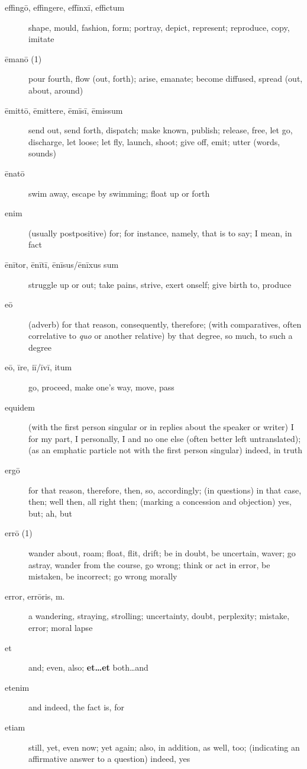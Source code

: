 \begin{description}
    \item[effingō, effingere, effīnxī, effictum] shape, mould, fashion, form; portray, depict, represent; reproduce, copy, imitate
    \item[ēmanō (1)] pour fourth, flow (out, forth); arise, emanate; become diffused, spread (out, about, around)
    \item[ēmittō, ēmittere, ēmīsī, ēmissum] send out, send forth, dispatch; make known, publish; release, free, let go, discharge, let loose; let fly, launch, shoot; give off, emit; utter (words, sounds)
    \item[ēnatō] swim away, escape by swimming; float up or forth
    \item[enim] (usually postpositive) for; for instance, namely, that is to say; I mean, in fact
    \item[ēnītor, ēnītī, ēnīsus/ēnīxus sum] struggle up or out; take pains, strive, exert onself; give birth to, produce
    \item[eō] (adverb) for that reason, consequently, therefore; (with comparatives, often correlative to \textit{quo} or another relative) by that degree, so much, to such a degree
    \item[eō, īre, iī/īvī, itum] go, proceed, make one's way, move, pass
    \item[equidem] (with the first person singular or in replies about the speaker or writer) I for my part, I personally, I and no one else (often better left untranslated); (as an emphatic particle not with the first person singular) indeed, in truth
    \item[ergō] for that reason, therefore, then, so, accordingly; (in questions) in that case, then; well then, all right then; (marking a concession and objection) yes, but; ah, but
    \item[errō (1)] wander about, roam; float, flit, drift; be in doubt, be uncertain, waver; go astray, wander from the course, go wrong; think or act in error, be mistaken, be incorrect; go wrong morally
    \item[error, errōris, m.] a wandering, straying, strolling; uncertainty, doubt, perplexity; mistake, error; moral lapse
    \item[et] and; even, also; \textbf{et\dots et} both\dots and
    \item[etenim] and indeed, the fact is, for
    \item[etiam] still, yet, even now; yet again; also, in addition, as well, too; (indicating an affirmative answer to a question) indeed, yes

\end{description}
